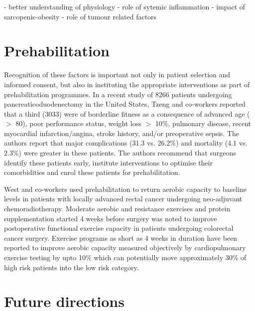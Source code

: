 - better understanding of physiology
- role of sytemic inflammation \parencite{van_heek_hospital_2005, ho_effect_2003, birkmeyer_surgeon_2003, halm_is_2002}
- impact of sarcopenic-obesity \parencite{joglekar_sarcopenia_2015, reisinger_sarcopenia_2015, gonzalez_obesity_2014}
- role of tumour related factors \parencite{williams_surgical_2014}

\section{Prehabilitation}


Recognition of these factors is important not only in patient selection and informed consent, but also in instituting the appropriate interventions as part of prehabilitation programmes. 
In a recent study of 8266 patients undergoing pancreaticoduodenectomy in the United States, Tzeng and co-workers reported that a third (3033) were of borderline fitness as a consequence of advanced age ($>$ 80), poor performance status, weight loss $>$ 10\%, pulmonary disease, recent myocardial infarction/angina, stroke history, and/or preoperative sepsis. 
The authors report that major complications (31.3 vs. 26.2\%) and mortality (4.1 vs. 2.3\%) were greater in these patients.\parencite{tzeng_morbidity_2014} 
The authors recommend that surgeons identify these patients early, institute interventions to optimise their comorbidities and enrol these patients for prehabilitation. 

West and co-workers used prehabilitation to return aerobic capacity to baseline levels in patients with locally advanced rectal cancer undergoing neo-adjuvant chemoradiotherapy.\parencite{west_effect_2015} 
Moderate aerobic and resistance exercises and protein supplementation started 4 weeks before surgery was noted to improve postoperative functional exercise capacity in patients undergoing colorectal cancer surgery.\parencite{gillis_prehabilitation_2014}
Exercise programs as short as 4 weeks in duration have been reported to improve aerobic capacity measured objectively by cardiopulmonary exercise testing by upto 10\% which can potentially move approximately 30\% of high risk patients into the low risk category.\parencite{dunne_pmo-029_2012}


\section{Future directions}


